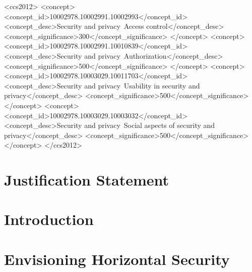 \documentclass[sigconf, authordraft, anonymous]{acmart}
\theoremstyle{mydef}
\begin{document}
\begin{CCSXML}
<ccs2012>
   <concept>
       <concept_id>10002978.10002991.10002993</concept_id>
       <concept_desc>Security and privacy~Access control</concept_desc>
       <concept_significance>300</concept_significance>
       </concept>
   <concept>
       <concept_id>10002978.10002991.10010839</concept_id>
       <concept_desc>Security and privacy~Authorization</concept_desc>
       <concept_significance>500</concept_significance>
       </concept>
   <concept>
       <concept_id>10002978.10003029.10011703</concept_id>
       <concept_desc>Security and privacy~Usability in security and privacy</concept_desc>
       <concept_significance>500</concept_significance>
       </concept>
   <concept>
       <concept_id>10002978.10003029.10003032</concept_id>
       <concept_desc>Security and privacy~Social aspects of security and privacy</concept_desc>
       <concept_significance>500</concept_significance>
       </concept>
 </ccs2012>
\end{CCSXML}



\maketitle

\section*{Justification Statement}
\label{sec:justification}


\section{Introduction}
\label{sec:introduction}


\section{Envisioning Horizontal Security}
\label{sec:envisioning}

\end{document}
